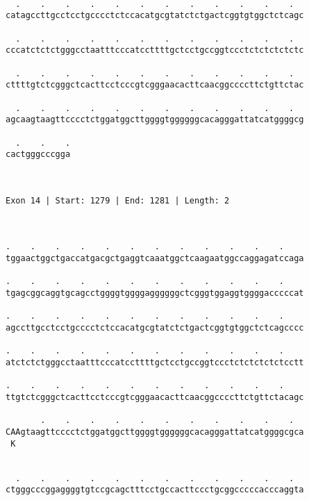 \documentclass{article}
\begin{document}
\begin{Verbatim}
  
  .    .    .    .    .    .    .    .    .    .    .    .  
catagccttgcctcctgcccctctccacatgcgtatctctgactcggtgtggctctcagc
                                                            
  .    .    .    .    .    .    .    .    .    .    .    .  
cccatctctctgggcctaatttcccatccttttgctcctgccggtccctctctctctctc
                                                            
  .    .    .    .    .    .    .    .    .    .    .    .  
cttttgtctcgggctcacttcctcccgtcgggaacacttcaacggccccttctgttctac
                                                            
  .    .    .    .    .    .    .    .    .    .    .    .  
agcaagtaagttcccctctggatggcttggggtggggggcacagggattatcatggggcg
                                                            
  .    .    .
cactgggcccgga
             
             
 
Exon 14 | Start: 1279 | End: 1281 | Length: 2



.    .    .    .    .    .    .    .    .    .    .    .    
tggaactggctgaccatgacgctgaggtcaaatggctcaagaatggccaggagatccaga
                                                            
.    .    .    .    .    .    .    .    .    .    .    .    
tgagcggcaggtgcagcctggggtggggaggggggctcgggtggaggtggggacccccat
                                                            
.    .    .    .    .    .    .    .    .    .    .    .    
agccttgcctcctgcccctctccacatgcgtatctctgactcggtgtggctctcagcccc
                                                            
.    .    .    .    .    .    .    .    .    .    .    .    
atctctctgggcctaatttcccatccttttgctcctgccggtccctctctctctctcctt
                                                            
.    .    .    .    .    .    .    .    .    .    .    .    
ttgtctcgggctcacttcctcccgtcgggaacacttcaacggccccttctgttctacagc
                                                            
       .    .    .    .    .    .    .    .    .    .    .  
CAAgtaagttcccctctggatggcttggggtggggggcacagggattatcatggggcgca
 K                                                          
                                                            
  
  .    .    .    .    .    .    .    .    .    .    .    .  
ctgggcccggaggggtgtccgcagctttcctgccacttccctgcggcccccacccaggta
                                                            

\end{Verbatim}
\end{document}

